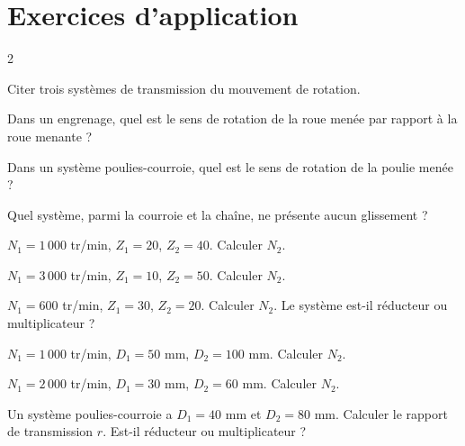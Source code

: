 \section{Exercices d'application}
\begin{multicols}{2}

\exo{} Citer trois systèmes de transmission du mouvement de rotation.

\exo{} Dans un engrenage, quel est le sens de rotation de la roue menée par
rapport à la roue menante ?

\exo{} Dans un système poulies-courroie, quel est le sens de rotation de la
poulie menée ?

\exo{} Quel système, parmi la courroie et la chaîne, ne présente aucun
glissement ?

\exo{} $N_1=1\,000$ tr/min, $Z_1=20$, $Z_2=40$. Calculer $N_2$.

\exo{} $N_1=3\,000$ tr/min, $Z_1=10$, $Z_2=50$. Calculer $N_2$.

\exo{} $N_1=600$ tr/min, $Z_1=30$, $Z_2=20$. Calculer $N_2$. Le système est-il
réducteur ou multiplicateur ?

\exo{} $N_1=1\,000$ tr/min, $D_1=50$ mm, $D_2=100$ mm. Calculer $N_2$.

\exo{} $N_1=2\,000$ tr/min, $D_1=30$ mm, $D_2=60$ mm. Calculer $N_2$.

\exo{} Un système poulies-courroie a $D_1=40$ mm et $D_2=80$ mm. Calculer le
rapport de transmission $r$. Est-il réducteur ou multiplicateur ?

\end{multicols}

